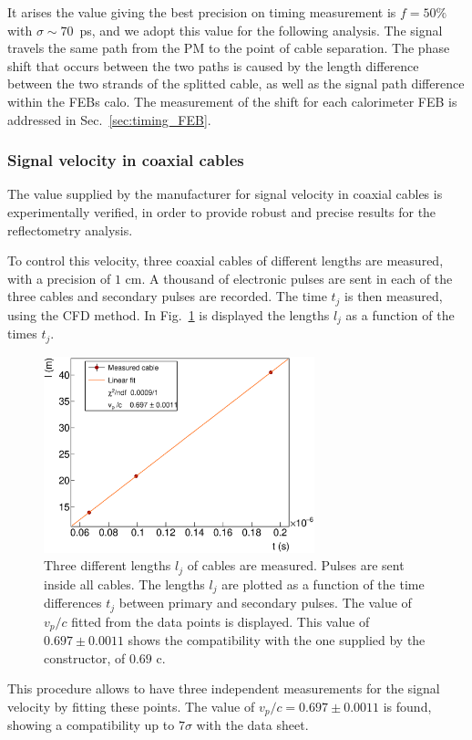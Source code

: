 It arises the value giving the best precision on timing measurement is $f = 50\%$ with $\sigma\sim70$~ps, and we adopt this value for the following analysis.
The signal travels the same path from the PM to the point of cable separation.
The phase shift that occurs between the two paths is caused by the length difference between the two strands of the splitted cable, as well as the signal path difference within the FEBs calo.
The measurement of the shift for each calorimeter FEB is addressed in Sec.~\ref{sec:timing_FEB}.

\subsubsection*{Signal velocity in coaxial cables}

The value supplied by the manufacturer for signal velocity in coaxial cables is experimentally verified, in order to provide robust and precise results for the reflectometry analysis.

To control this velocity, three coaxial cables of different lengths are measured, with a precision of $1$ cm.
A thousand of electronic pulses are sent in each of the three cables and secondary pulses are recorded.
The time $t_{j}$ is then measured, using the CFD method.
In Fig.~\ref{fig:celerity} is displayed the lengths $l_{j}$ as a function of the times $t_{j}$.
\begin{figure}[h!]
  \centering
  \includegraphics[width=0.7\textwidth]{commissioning/fig_commissioning/celerity.eps}
  \caption{Three different lengths $l_{j}$ of cables are measured.
    Pulses are sent inside all cables.
    The lengths $l_{j}$ are plotted as a function of the time differences $t_{j}$ between primary and secondary pulses.
    The value of $v_{p}/c$ fitted from the data points is displayed.
    This value of $0.697\pm 0.0011$ shows the compatibility with the one supplied by the constructor, of $0.69$ c.
    \label{fig:celerity}}
\end{figure}
This procedure allows to have three independent measurements for the signal velocity by fitting these points.
The value of $v_{p}/c = 0.697\pm 0.0011$ is found, showing a compatibility up to $7\sigma$ with the data sheet.

